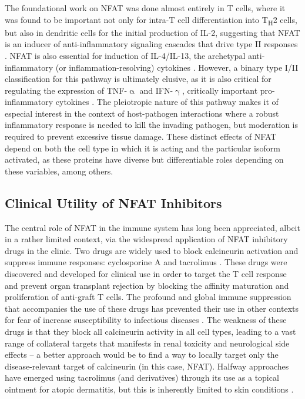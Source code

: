 The foundational work on NFAT was done almost entirely in T cells, where it was found to be important not only for intra\hyp{}T cell differentiation into T\textsubscript{H}2 cells, but also in dendritic cells for the initial production of IL\hyp{}2, suggesting that NFAT is an inducer of anti\hyp{}inflammatory signaling cascades that drive type II responses \citep{Granucci2001, Granucci2003}. NFAT is also essential for induction of IL\hyp{}4/IL\hyp{}13, the archetypal anti\hyp{}inflammatory (or inflammation\hyp{}resolving) cytokines \citep{Monticelli2004, Agarwal2000, Monticelli2002, Wierenga2000}. However, a binary type I/II classification for this pathway is ultimately elusive, as it is also critical for regulating the expression of TNF\hyp{}$\upalpha$ and IFN\hyp{}$\upgamma$, critically important pro\hyp{}inflammatory cytokines \citep{Kiani2001, Sica1997, Kaminuma2008, Ke2006, Fric2012a}. The pleiotropic nature of this pathway makes it of especial interest in the context of host\hyp{}pathogen interactions where a robust inflammatory response is needed to kill the invading pathogen, but moderation is required to prevent excessive tissue damage. These distinct effects of NFAT depend on both the cell type in which it is acting and the particular isoform activated, as these proteins have diverse but differentiable roles depending on these variables, among others.

\subsection{Clinical Utility of NFAT Inhibitors}\label{tacrolimus}

The central role of NFAT in the immune system has long been appreciated, albeit in a rather limited context, via the widespread application of NFAT inhibitory drugs in the clinic. Two drugs are widely used to block calcineurin activation and suppress immune responses: cyclosporine A and tacrolimus \citep{Mihatsch1998}. These drugs were discovered and developed for clinical use in order to target the T cell response and prevent organ transplant rejection by blocking the affinity maturation and proliferation of anti\hyp{}graft T cells. The profound and global immune suppression that accompanies the use of these drugs has prevented their use in other contexts for fear of increase susceptibility to infectious diseases \citep{vanSandwijk2013}. The weakness of these drugs is that they block all calcineurin activity in all cell types, leading to a vast range of collateral targets that manifests in renal toxicity and neurological side effects -- a better approach would be to find a way to locally target only the disease\hyp{}relevant target of calcineurin (in this case, NFAT). Halfway approaches have emerged using tacrolimus (and derivatives) through its use as a topical ointment for atopic dermatitis, but this is inherently limited to skin conditions \citep{Cheer2001, AlDaraji2002, Gupta2002, Gutfreund2013}. 

